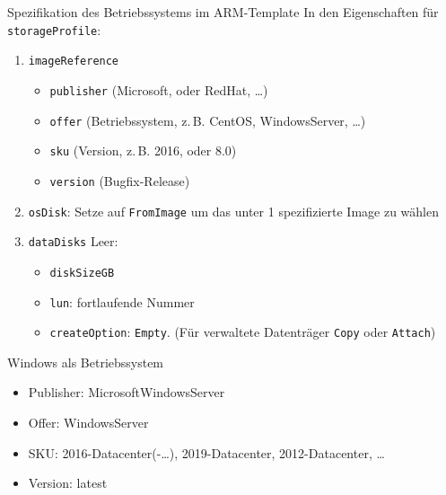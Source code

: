 \begin{flashcard}[Definition]{Spezifikation des Betriebssystems im ARM-Template}
    In den Eigenschaften für \texttt{storageProfile}:
    \begin{enumerate}
        \item \texttt{imageReference}
            \begin{itemize}
                \item \texttt{publisher} (Microsoft, oder RedHat, \ldots)
                \item \texttt{offer} (Betriebssystem, z.\,B. CentOS, WindowsServer, \ldots)
                \item \texttt{sku} (Version, z.\,B. 2016, oder 8.0)
                \item \texttt{version} (Bugfix-Release)
            \end{itemize}
        \item \texttt{osDisk}:\newline
            Setze auf \texttt{FromImage} um das unter 1 spezifizierte Image zu wählen
        \item \texttt{dataDisks}\newline
            Leer:
            \begin{itemize}
             \item \texttt{diskSizeGB}
             \item \texttt{lun}: fortlaufende Nummer
             \item \texttt{createOption}: \texttt{Empty}. (Für verwaltete Datenträger \texttt{Copy} oder \texttt{Attach})
            \end{itemize}
    \end{enumerate}
\end{flashcard}

\begin{flashcard}[Definition]{Windows als Betriebssystem}
    \begin{itemize}
        \item Publisher: MicrosoftWindowsServer
        \item Offer: WindowsServer
        \item SKU: 2016-Datacenter(-\ldots), 2019-Datacenter, 2012-Datacenter, \ldots
        \item Version: latest
    \end{itemize}
\end{flashcard}

